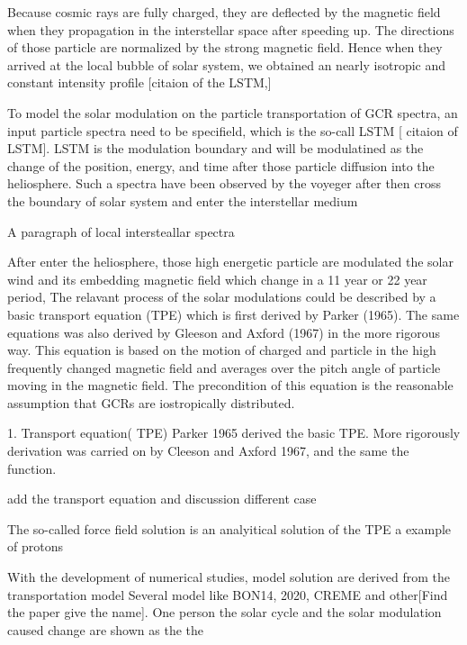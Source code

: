 Because cosmic rays are fully charged, they are deflected by the magnetic field when they propagation in the interstellar space after speeding up. The directions of those particle are normalized by the strong magnetic field. Hence when they arrived at the local bubble of solar system, we obtained an nearly isotropic and constant intensity profile [citaion of the LSTM,]


To model the solar modulation on the particle transportation of GCR spectra, an input particle spectra need to be specifield, which is the so-call LSTM [ citaion of LSTM]. LSTM is the modulation boundary and will be modulatined as the change of the position, energy, and time after those particle diffusion into the heliosphere. Such a spectra have been observed by the voyeger after then cross the boundary of solar system and enter the interstellar medium
	
A paragraph of local intersteallar spectra


After enter the heliosphere, those high energetic particle are modulated the solar wind and its embedding magnetic field  which change in a 11 year or 22 year period,
The relavant process of the solar modulations could be described by a basic transport equation (TPE) which is first derived by Parker (1965). The same equations was also derived by Gleeson and Axford (1967) in the more rigorous way. This equation is based on the motion of charged and particle in the high frequently changed magnetic field and averages over the pitch angle of particle moving in the magnetic field. The precondition of this equation is the reasonable assumption that GCRs are iostropically distributed.

1. Transport equation( TPE)
	 Parker 1965 derived the basic TPE. More rigorously derivation was carried on by Cleeson and Axford 1967, and the same the function.
	
	add the transport equation and discussion different case
	
    The so-called force field solution is an analyitical solution of the TPE a example of protons
    
    
    With the development of numerical studies, model solution are derived from the transportation model
    Several model like BON14, 2020, CREME and other[Find the paper give the name]. One person  
 the solar cycle and the solar modulation caused change are shown as the the 

\begin{figure}
	\centering
	
	
\end{figure}
	
